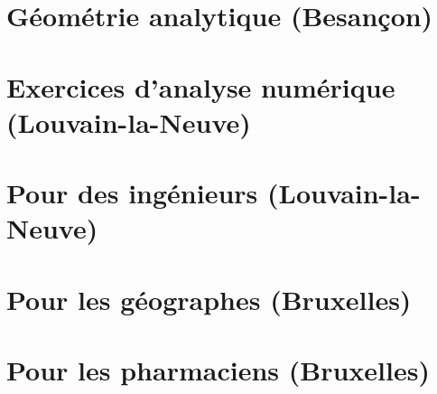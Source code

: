 
\chapter{Géométrie analytique (Besançon)}


\chapter{Exercices d'analyse numérique (Louvain-la-Neuve)}



\chapter{Pour des ingénieurs (Louvain-la-Neuve)}



\chapter{Pour les géographes (Bruxelles)}


\chapter{Pour les pharmaciens (Bruxelles)}




%
